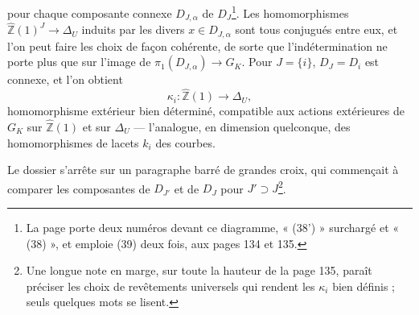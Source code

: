 \documentclass[11pt,a4paper]{article}
\begin{document}

pour chaque composante connexe $D_{J,\alpha}$ de $D_J$\footnote{La page porte
deux numéros devant ce diagramme, « (38') » surchargé et « (38) », et
emploie (39) deux fois, aux pages 134 et 135.}. Les homomorphismes
$\widehat{\mathbb{Z}}(1)^J \to \Delta_U$ induits par les divers $x \in
D_{J,\alpha}$ sont tous conjugués entre eux, et l'on peut faire les choix de
façon cohérente, de sorte que l'indétermination ne porte plus que sur l'image
de $\pi_1(D_{J,\alpha}) \to G_K$. Pour $J = \{i\}$, $D_J = D_i$ est connexe, et
l'on obtient
\[
\kappa_i : \widehat{\mathbb{Z}}(1) \longrightarrow \Delta_U ,
\]
homomorphisme extérieur bien déterminé, compatible aux actions extérieures de
$G_K$ sur $\widehat{\mathbb{Z}}(1)$ et sur $\Delta_U$ — l'analogue, en dimension
quelconque, des homomorphismes de lacets $k_i$ des courbes.

Le dossier s'arrête sur un paragraphe barré de grandes croix, qui commençait
à comparer les composantes de $D_{J'}$ et de $D_J$ pour $J' \supset J$\footnote{Une
longue note en marge, sur toute la hauteur de la page 135, paraît préciser les
choix de revêtements universels qui rendent les $\kappa_i$ bien définis ; seuls
quelques mots se lisent.}.
\end{document}
